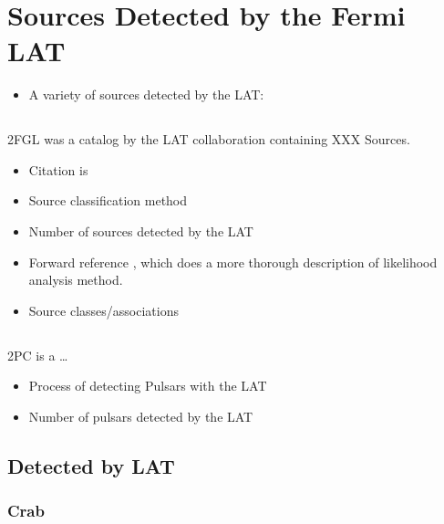 
\section{Sources Detected by the Fermi \acrlong{LAT}}

\begin{itemize}
  \item A variety of sources detected by the \Acrlong{LAT}:
\end{itemize}

\subsection{}

\Gls{2FGL} was a catalog by the LAT collaboration containing XXX Sources.

\begin{itemize}
  \item Citation is \cite{nolan_2012_fermi-large}
  \item Source classification method
  \item Number of sources detected by the \gls{LAT}
  \item Forward reference ,
    which does a more thorough description of likelihood analysis method.
  \item Source classes/associations
\end{itemize}

\subsection{}

\Gls{2PC} is a \ldots
{}

\begin{itemize}
  \item Process of detecting Pulsars with the \gls{LAT}
  \item Number of pulsars detected by the \gls{LAT}
\end{itemize}

\subsection{ Detected by \Acrlong{LAT}}

\subsubsection{Crab}

